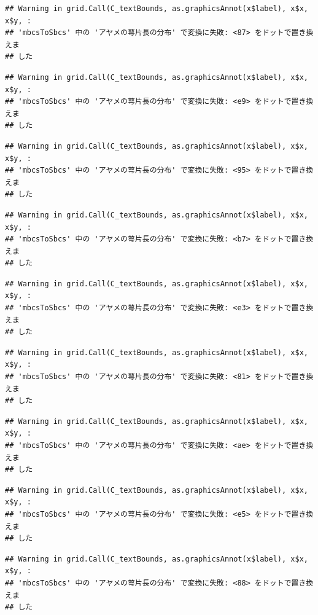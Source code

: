 \documentclass[
]{book}
\begin{document}
\begin{verbatim}
## Warning in grid.Call(C_textBounds, as.graphicsAnnot(x$label), x$x, x$y, :
## 'mbcsToSbcs' 中の 'アヤメの萼片長の分布' で変換に失敗: <87> をドットで置き換えま
## した
\end{verbatim}

\begin{verbatim}
## Warning in grid.Call(C_textBounds, as.graphicsAnnot(x$label), x$x, x$y, :
## 'mbcsToSbcs' 中の 'アヤメの萼片長の分布' で変換に失敗: <e9> をドットで置き換えま
## した
\end{verbatim}

\begin{verbatim}
## Warning in grid.Call(C_textBounds, as.graphicsAnnot(x$label), x$x, x$y, :
## 'mbcsToSbcs' 中の 'アヤメの萼片長の分布' で変換に失敗: <95> をドットで置き換えま
## した
\end{verbatim}

\begin{verbatim}
## Warning in grid.Call(C_textBounds, as.graphicsAnnot(x$label), x$x, x$y, :
## 'mbcsToSbcs' 中の 'アヤメの萼片長の分布' で変換に失敗: <b7> をドットで置き換えま
## した
\end{verbatim}

\begin{verbatim}
## Warning in grid.Call(C_textBounds, as.graphicsAnnot(x$label), x$x, x$y, :
## 'mbcsToSbcs' 中の 'アヤメの萼片長の分布' で変換に失敗: <e3> をドットで置き換えま
## した
\end{verbatim}

\begin{verbatim}
## Warning in grid.Call(C_textBounds, as.graphicsAnnot(x$label), x$x, x$y, :
## 'mbcsToSbcs' 中の 'アヤメの萼片長の分布' で変換に失敗: <81> をドットで置き換えま
## した
\end{verbatim}

\begin{verbatim}
## Warning in grid.Call(C_textBounds, as.graphicsAnnot(x$label), x$x, x$y, :
## 'mbcsToSbcs' 中の 'アヤメの萼片長の分布' で変換に失敗: <ae> をドットで置き換えま
## した
\end{verbatim}

\begin{verbatim}
## Warning in grid.Call(C_textBounds, as.graphicsAnnot(x$label), x$x, x$y, :
## 'mbcsToSbcs' 中の 'アヤメの萼片長の分布' で変換に失敗: <e5> をドットで置き換えま
## した
\end{verbatim}

\begin{verbatim}
## Warning in grid.Call(C_textBounds, as.graphicsAnnot(x$label), x$x, x$y, :
## 'mbcsToSbcs' 中の 'アヤメの萼片長の分布' で変換に失敗: <88> をドットで置き換えま
## した
\end{verbatim}
\end{document}
